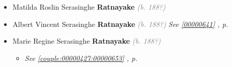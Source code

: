 \documentclass[10pt, openany]{book}
\begin{document}
\begin{itemize}
{\begin{itemize}
{\begin{itemize}
{\begin{itemize}
{\begin{itemize}
{\begin{itemize}
\item{Dilani \textbf{Ranatunge} \textcolor{gray}{\textit{(b. 195?)}}
 }
\end{itemize}}
\end{itemize}
 }
\end{itemize}}
\end{itemize}
   }
\item{Matilda Roslin Serasinghe \textbf{Ratnayake} \textcolor{gray}{\textit{(b. 188?)}}
   }
\item{Albert Vincent Serasinghe \textbf{Ratnayake} \textcolor{gray}{\textit{(b. 188?)}} \textcolor{slteal}{\textit{See  \autoref{00000641} \textit{, p. \pageref{00000641} }}}}
\item{Marie Regine Serasinghe \textbf{Ratnayake} \textcolor{gray}{\textit{(b. 188?)}}
\begin{itemize}
\item{\textcolor{slteal}{\textit{See  \autoref{couple:00000427:00000653} \textit{, p. \pageref{couple:00000427:00000653} }}}}
\end{itemize}
   }
\end{itemize}}
\end{itemize}
    
\end{document}
